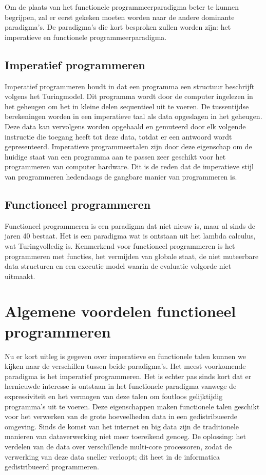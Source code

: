 \documentclass[twoside,twocolumn]{article}
\begin{document}
Om de plaats van het functionele programmeerparadigma beter te kunnen
begrijpen, zal er eerst gekeken moeten worden naar de andere dominante
paradigma's. De paradigma's die kort besproken zullen worden zijn: het
imperatieve en functionele programmeerparadigma.


\subsection{Imperatief programmeren}
Imperatief programmeren houdt in dat een programma een structuur beschrijft
volgens het Turingmodel. Dit programma wordt door de computer ingelezen in het
geheugen om het in kleine delen sequentieel uit te voeren. De tussentijdse
berekeningen worden in een imperatieve taal als data opgeslagen in het
geheugen. Deze data kan vervolgens worden opgehaald en gemuteerd door elk
volgende instructie die toegang heeft tot deze data, totdat er een antwoord
wordt gepresenteerd. Imperatieve programmeertalen zijn door deze eigenschap om
de huidige staat van een programma aan te passen zeer geschikt voor het
programmeren van computer hardware. Dit is de reden dat de imperatieve stijl
van programmeren hedendaags de gangbare manier van programmeren is.

\subsection{Functioneel programmeren}
Functioneel programmeren is een paradigma dat niet nieuw is, maar al sinds de
jaren 40 bestaat. Het is een paradigma wat is ontstaan uit het lambda
calculus\cite{pro1}, wat Turingvolledig is. Kenmerkend voor functioneel programmeren is het
programmeren met functies, het vermijden van globale staat, de niet
muteerbare data structuren en een executie model waarin de evaluatie volgorde
niet uitmaakt.


\section{Algemene voordelen functioneel programmeren}

Nu er kort uitleg is gegeven over imperatieve en functionele talen kunnen we
kijken naar de verschillen tussen beide paradigma's. Het meest voorkomende
paradigma is het imperatief programmeren. Het is echter pas sinds kort dat
er hernieuwde interesse is ontstaan in het functionele paradigma vanwege de
expressiviteit en het vermogen van deze talen om foutloos gelijktijdig
programma's uit te voeren. Deze eigenschappen maken functionele talen geschikt
voor het verwerken van de grote hoeveelheden data in een gedistribueerde
omgeving. Sinds de komst van het internet en big data zijn de traditionele
manieren van dataverwerking niet meer toereikend genoeg. De oplossing: het
verdelen van de data over verschillende multi-core processoren,
zodat de verwerking van deze data sneller verloopt; dit heet in de informatica
gedistribueerd programmeren.
\end{document}
